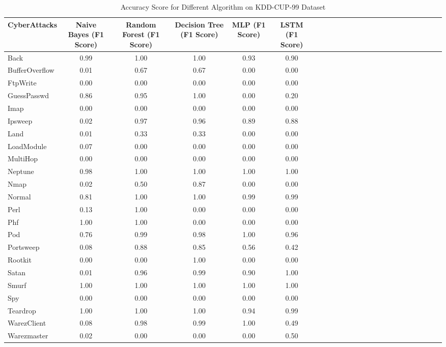 \documentclass[conference]{IEEEtran}
\begin{document}
\begin{table}
\caption{Accuracy Score for Different Algorithm on KDD-CUP-99 Dataset}
\label{table:05}
\begin{tabularx}{\textwidth}{@{}l*{22}{C}c@{}}
\toprule
\bf CyberAttacks  & \bf Naive Bayes (F1 Score)  & \bf Random Forest (F1 Score) & \bf Decision Tree (F1 Score) & \bf MLP (F1 Score) & \bf LSTM (F1 Score) \\ 
\midrule
Back            & 0.99      & 1.00          & 1.00    & 0.93       & 0.90 \\
BufferOverflow  & 0.01      & 0.67          & 0.67    & 0.00       & 0.00 \\ 
FtpWrite        & 0.00      & 0.00          & 0.00    & 0.00       & 0.00 \\
GuessPasswd     & 0.86      & 0.95          & 1.00    & 0.00       & 0.20 \\ 
Imap            & 0.00      & 0.00          & 0.00    & 0.00       & 0.00 \\ 
Ipsweep         & 0.02      & 0.97          & 0.96    & 0.89       & 0.88 \\ 
Land            & 0.01      & 0.33          & 0.33    & 0.00       & 0.00 \\ 
LoadModule      & 0.07      & 0.00          & 0.00    & 0.00       & 0.00 \\ 
MultiHop        & 0.00      & 0.00          & 0.00    & 0.00       & 0.00 \\ 
Neptune         & 0.98      & 1.00          & 1.00    & 1.00       & 1.00 \\ 
Nmap            & 0.02      & 0.50          & 0.87    & 0.00       & 0.00 \\ 
Normal          & 0.81      & 1.00          & 1.00    & 0.99       & 0.99 \\ 
Perl            & 0.13      & 1.00          & 0.00    & 0.00       & 0.00 \\ 
Phf             & 1.00      & 1.00          & 0.00    & 0.00       & 0.00 \\ 
Pod             & 0.76      & 0.99          & 0.98    & 1.00       & 0.96 \\ 
Portsweep       & 0.08      & 0.88          & 0.85    & 0.56       & 0.42 \\ 
Rootkit         & 0.00      & 0.00          & 1.00    & 0.00       & 0.00 \\ 
Satan           & 0.01      & 0.96          & 0.99    & 0.90       & 1.00 \\ 
Smurf           & 1.00      & 1.00          & 1.00    & 1.00       & 1.00 \\ 
Spy             & 0.00      & 0.00          & 0.00    & 0.00       & 0.00 \\ 
Teardrop        & 1.00      & 1.00          & 1.00    & 0.94       & 0.99 \\ 
WarezClient     & 0.08      & 0.98          & 0.99    & 1.00       & 0.49 \\ 
Warezmaster     & 0.02      & 0.00          & 0.00    & 0.00       & 0.50 \\ 


\bottomrule
\end{tabularx}
\end{table}
\end{document}
